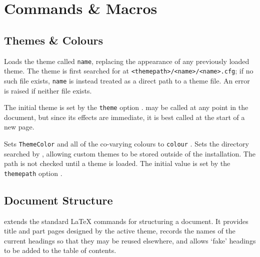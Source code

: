 




\chapter{Commands \& Macros}

	\section{Themes \& Colours}\label{S:ThemeSelection}

		{
			Loads the theme called \texttt{name}, replacing the appearance of any previously loaded theme. The theme is first searched for at \texttt{<themepath>/<name>/<name>.cfg}; if no such file exists, \texttt{name} is instead treated as a direct path to a theme file. An error is raised if neither file exists.

			The initial theme is set by the \texttt{theme} option .  may be called at any point in the document, but since its effects are immediate, it is best called at the start of a new page.
		}
		{
			Sets \texttt{ThemeColor} and all of the co-varying colours to \texttt{colour} .
		}
		{
			Sets the directory searched by , allowing custom themes to be stored outside of the \rpgtex{} installation. The path is not checked until a theme is loaded. The initial value is set by the \texttt{themepath} option .
		}

	\section{Document Structure}\label{S:DocStructure}

		\rpgtex{} extends the standard \LaTeX{} commands for structuring a document. It provides title and part pages designed by the active theme, records the names of the current headings so that they may be reused elsewhere, and allows `fake' headings to be added to the table of contents.

